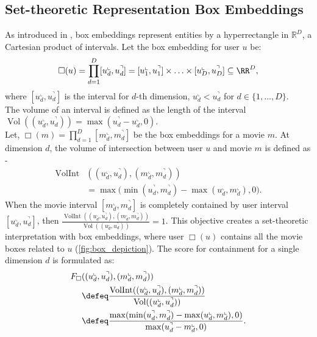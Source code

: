 \subsection{Set-theoretic Representation Box Embeddings}
\label{sec:box_embeddings}
{As introduced in \citet{hard_box}, box embeddings represent entities by a hyperrectangle in $\mathbb{R}^D$, \ie a Cartesian product of intervals. Let the box embedding for user $u$ be: \[\Box(u) = \prod_{d=1}^D[u_d^\llcorner, u_d^\urcorner] = [u_1^\llcorner, u_1^\urcorner] \times \ldots \times [u_D^\llcorner, u_D^\urcorner] \subseteq \RR^D,\] where $[u_d^\llcorner, u_d^\urcorner]$ is the interval for $d$-th dimension, $u_d^\llcorner < u_d^\urcorner$ for $d \in \{1, \ldots, D\}$. \\
The volume of an interval is defined as the length of the interval $\operatorname{Vol}((u_d^\llcorner, u_d^\urcorner)) = \max(u_d^\urcorner-u_d^\llcorner, 0)$. \\
Let, $\Box(m) = \prod_{d=1}^D[m_d^\llcorner, m_d^\urcorner]$ be the box embeddings for a movie $m$. At dimension $d$, the volume of intersection between user $u$ and movie $m$ is defined as - 
\begin{align*}
    \operatorname{VolInt} &((u_d^\llcorner, u_d^\urcorner), (m_d^\llcorner, m_d^\urcorner)) \\ &= 
    \max \Big( \min(u_d^\urcorner, m_d^\urcorner)
    - \max(u_d^\llcorner, m_d^\llcorner), 0 \Big).
\end{align*}
}
When the movie interval $[m_d^\llcorner, m_d^\urcorner]$ is completely contained by user interval $[u_d^\llcorner, u_d^\urcorner]$, then $\frac{\operatorname{VolInt}((u_d^\llcorner, u_d^\urcorner), (m_d^\llcorner, m_d^\urcorner))}{\operatorname{Vol}((u_d^\llcorner, u_d^\urcorner))} = 1$. This objective creates a set-theoretic interpretation with box embeddings, where user $\Box(u)$ contains all the movie boxes related to $u$ (\cref{fig:box_depiction}). The score for containment for a single dimension $d$ is formulated as:
\begin{align}
F_{\Box}&((u_d^\llcorner, u_d^\urcorner), (m_d^\llcorner, m_d^\urcorner)) \notag \\
&\defeq \frac{\operatorname{VolInt}((u_d^\llcorner, u_d^\urcorner), 
(m_d^\llcorner, m_d^\urcorner))}{\operatorname{Vol}((u_d^\llcorner, u_d^\urcorner))} \notag \\
&\defeq \frac{\max(\min(u_d^\urcorner, m_d^\urcorner) - \max(u_d^\llcorner, m_d^\llcorner), 0)}
{\max(u_d^\urcorner - m_d^\llcorner, 0)}.
\end{align}
